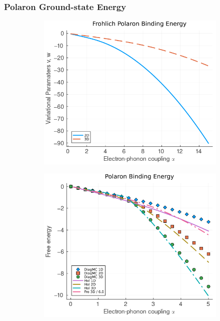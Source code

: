 \subsubsection{Polaron Ground-state Energy}

\begin{figure}
  \begin{subfigure}[b]{0.49\textwidth}
    \includegraphics[width=\textwidth]{figures/energy_alpha_fro.png}
  \end{subfigure}
  \hfill
  \begin{subfigure}[b]{0.49\textwidth}
    \includegraphics[width=\textwidth]{figures/energy_alpha.png}

\end{subfigure}
\end{figure}
